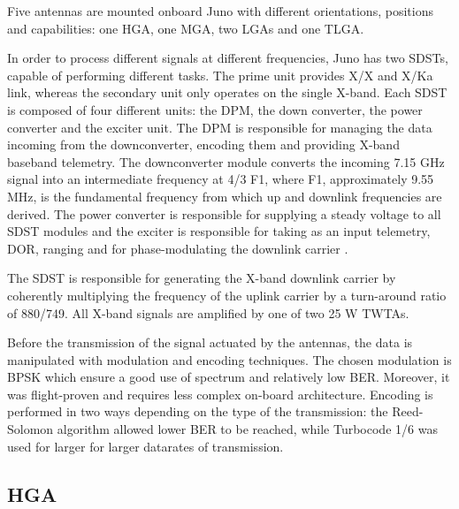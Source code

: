 Five antennas are mounted onboard Juno with different orientations, positions and capabilities: one HGA, one MGA, two LGAs and one TLGA. 

In order to process different signals at different frequencies, Juno has two SDSTs, capable of performing different tasks. The prime unit provides X/X and X/Ka link, whereas the secondary unit only operates on the single X-band. Each SDST is composed of four different units: the DPM, the down converter, the power converter and the exciter unit. 
The DPM is responsible for managing the data incoming from the downconverter, encoding them and providing X-band baseband telemetry. The downconverter module converts the incoming 7.15 GHz signal into an intermediate frequency at 4/3 F1, where F1, approximately 9.55 MHz, is the fundamental frequency from which up and downlink frequencies are derived. The power converter is responsible for supplying a steady voltage to all SDST modules and the exciter is responsible for taking as an input telemetry, DOR, ranging and for phase-modulating the downlink carrier \cite{juno_telecommunication}\cite{ka_uplink}. 

The SDST is responsible for generating the X-band downlink carrier by coherently multiplying the frequency of the uplink carrier by a turn-around ratio of 880/749. All X-band signals are amplified by one of two 25 W TWTAs\cite{juno_telecommunication}.  

Before the transmission of the signal actuated by the antennas, the data is manipulated with modulation and encoding techniques. The chosen modulation is BPSK which ensure a good use of spectrum and relatively low BER. Moreover, it was flight-proven and requires less complex on-board architecture.
Encoding is performed in two ways depending on the type of the transmission: the Reed-Solomon algorithm allowed lower BER to be reached, while Turbocode 1/6 was used for larger for larger datarates of transmission. 

\subsection{HGA}
\label{subsec:hga}


